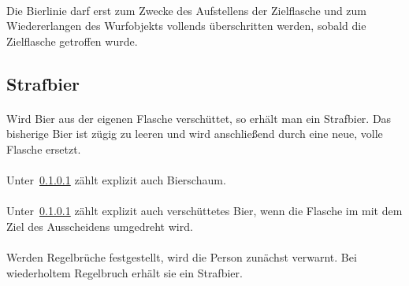 \paragraph{}
Die Bierlinie darf erst zum Zwecke des Aufstellens der Zielflasche und zum Wiedererlangen des Wurfobjekts vollends überschritten werden, sobald die Zielflasche getroffen wurde.

\subsection{Strafbier}
\paragraph{}\label{Flunkyball:Strafbier:Allg}
Wird Bier aus der eigenen Flasche verschüttet, so erhält man ein Strafbier.
Das bisherige Bier ist zügig zu leeren und wird anschließend durch eine neue, volle Flasche ersetzt.

\paragraph{}
Unter~\ref{Flunkyball:Strafbier:Allg} zählt explizit auch Bierschaum.

\paragraph{}
Unter~\ref{Flunkyball:Strafbier:Allg} zählt explizit auch verschüttetes Bier, wenn die Flasche im mit dem Ziel des Ausscheidens umgedreht wird.

\paragraph{}
Werden Regelbrüche festgestellt, wird die Person zunächst verwarnt.
Bei wiederholtem Regelbruch erhält sie ein Strafbier.
